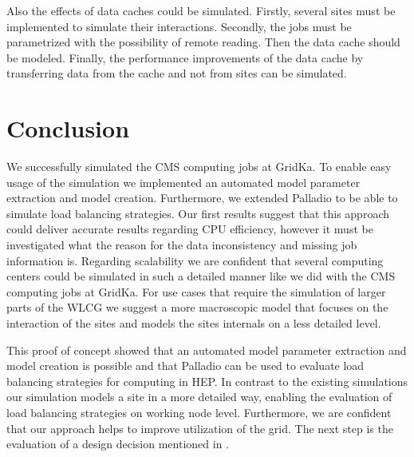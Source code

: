 \documentclass[runningheads,a4paper]{llncs}[2017/09/04]
\begin{document}
Also the effects of data caches could be simulated. Firstly, several sites must be implemented to simulate their interactions. Secondly, the jobs must be parametrized with the possibility of remote reading. Then the data cache should be modeled. Finally, the performance improvements of the data cache by transferring data from the cache and not from sites can be simulated.
\section{Conclusion}
\label{conlusion}
We successfully simulated the CMS computing jobs at GridKa. To enable easy usage of the simulation we implemented an automated model parameter extraction and model creation. Furthermore, we extended Palladio to be able to simulate load balancing strategies. Our first results suggest that this approach could deliver accurate results regarding CPU efficiency, however it must be investigated what the reason for the data inconsistency and missing job information is. Regarding scalability we are confident that several computing centers could be simulated in such a detailed manner like we did with the CMS computing jobs at GridKa. For use cases that require the simulation of larger parts of the WLCG we suggest a more macroscopic model that focuses on the interaction of the sites and models the sites internals on a less detailed level.

This proof of concept showed that an automated model parameter extraction and model creation is possible and that Palladio can be used to evaluate load balancing strategies for computing in HEP. In contrast to the existing simulations our simulation models a site in a more detailed way, enabling the evaluation of load balancing strategies on working node level. Furthermore, we are confident that our approach helps to improve utilization of the grid. The next step is the evaluation of a design decision mentioned in .



\renewcommand{\bibsection}{\section*{References}} %

\begingroup
  \ifluatex
  \else
  \fi
  \small %
  
\endgroup

\ \\
%
\end{document}
